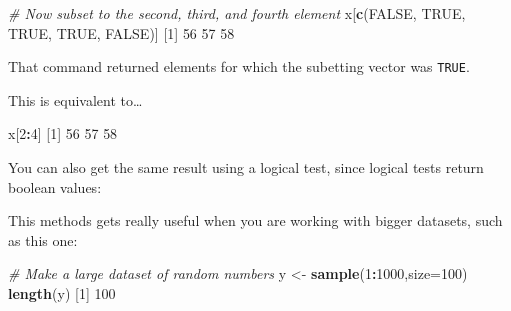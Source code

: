 \documentclass[]{book}
\newenvironment{Shaded}{\begin{snugshade}}{\end{snugshade}}
\newcommand{\CommentTok}[1]{\textcolor[rgb]{0.56,0.35,0.01}{\textit{#1}}}
\newcommand{\DataTypeTok}[1]{\textcolor[rgb]{0.13,0.29,0.53}{#1}}
\newcommand{\DecValTok}[1]{\textcolor[rgb]{0.00,0.00,0.81}{#1}}
\newcommand{\KeywordTok}[1]{\textcolor[rgb]{0.13,0.29,0.53}{\textbf{#1}}}
\newcommand{\NormalTok}[1]{#1}
\newcommand{\OperatorTok}[1]{\textcolor[rgb]{0.81,0.36,0.00}{\textbf{#1}}}
\newcommand{\OtherTok}[1]{\textcolor[rgb]{0.56,0.35,0.01}{#1}}
\newcommand{\StringTok}[1]{\textcolor[rgb]{0.31,0.60,0.02}{#1}}
\begin{document}
\begin{Shaded}
\begin{Highlighting}[]
\CommentTok{# Now subset to the second, third, and fourth element}
\NormalTok{x[}\KeywordTok{c}\NormalTok{(}\OtherTok{FALSE}\NormalTok{, }\OtherTok{TRUE}\NormalTok{, }\OtherTok{TRUE}\NormalTok{, }\OtherTok{TRUE}\NormalTok{, }\OtherTok{FALSE}\NormalTok{)]}
\NormalTok{[}\DecValTok{1}\NormalTok{] }\DecValTok{56} \DecValTok{57} \DecValTok{58}
\end{Highlighting}
\end{Shaded}

That command returned elements for which the subetting vector was \texttt{TRUE}.

This is equivalent to\ldots{}

\begin{Shaded}
\begin{Highlighting}[]
\NormalTok{x[}\DecValTok{2}\OperatorTok{:}\DecValTok{4}\NormalTok{]}
\NormalTok{[}\DecValTok{1}\NormalTok{] }\DecValTok{56} \DecValTok{57} \DecValTok{58}
\end{Highlighting}
\end{Shaded}

You can also get the same result using a logical test, since logical tests return boolean values:

\begin{Shaded}
\end{Shaded}

This methods gets really useful when you are working with bigger datasets, such as this one:

\begin{Shaded}
\begin{Highlighting}[]
\CommentTok{# Make a large dataset of random numbers}
\NormalTok{y <-}\StringTok{ }\KeywordTok{sample}\NormalTok{(}\DecValTok{1}\OperatorTok{:}\DecValTok{1000}\NormalTok{,}\DataTypeTok{size=}\DecValTok{100}\NormalTok{)}
\KeywordTok{length}\NormalTok{(y)}
\NormalTok{[}\DecValTok{1}\NormalTok{] }\DecValTok{100}
\end{Highlighting}
\end{Shaded}
\end{document}

